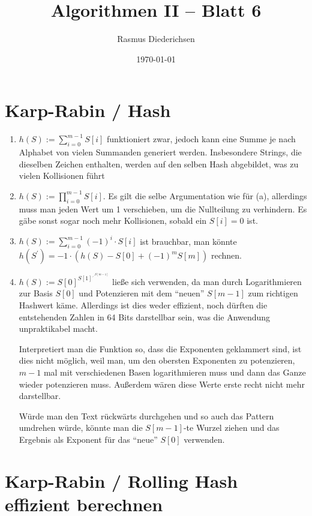 \documentclass{article}
\title{Algorithmen II -- Blatt 6}
\author{Rasmus Diederichsen}
\date{\today}
\begin{document}
\maketitle

\section{Karp-Rabin / Hash}
\begin{enumerate}[label=\textbf{(\alph{*})}]
   \item $h(S) := \sum_{i=0}^{m-1}S[i]$ funktioniert zwar, jedoch kann eine Summe
      je nach Alphabet von vielen Summanden generiert werden. Insbesondere
      Strings, die dieselben Zeichen enthalten, werden auf den selben Hash
      abgebildet, was zu vielen Kollisionen führt
   \item $h(S) := \prod_{i=0}^{m-1}S[i]$. Es gilt die selbe Argumentation wie
      für (a), allerdings muss man jeden Wert um 1 verschieben, um die
      Nullteilung zu verhindern. Es gäbe sonst sogar noch mehr Kollisionen,
      sobald ein $S[i] = 0$ ist.
   \item $h(S) := \sum_{i=0}^{m-1}(-1)^i\cdot S[i]$ ist brauchbar,
      man könnte $h(S^\prime) = -1 \cdot (h(S) - S[0] + (-1)^m S[m])$ rechnen.
   \item $h(S) := S[0]^{{S[1]}^{\iddots^{S[m-1]}}}$ ließe sich verwenden, da man
      durch Logarithmieren zur Basis $S[0]$ und Potenzieren mit dem ``neuen''
      $S[m-1]$ zum richtigen Hashwert käme. Allerdings ist dies weder
      effizient, noch dürften die entstehenden Zahlen in 64 Bits darstellbar
      sein, was die Anwendung unpraktikabel macht.

      Interpretiert man die Funktion so, dass die Exponenten geklammert sind,
      ist dies nicht möglich, weil man, um den obersten Exponenten
      zu potenzieren, $m-1$ mal mit verschiedenen Basen logarithmieren muss und
      dann das Ganze wieder potenzieren muss. Außerdem wären diese Werte erste
      recht nicht mehr darstellbar.

      Würde man den Text rückwärts durchgehen und so auch das Pattern umdrehen
      würde, könnte man die $S[m-1]$-te Wurzel ziehen und das Ergebnis als
      Exponent für das ``neue'' $S[0]$ verwenden.
\end{enumerate}

\section{Karp-Rabin / Rolling Hash effizient berechnen}
\end{document}
